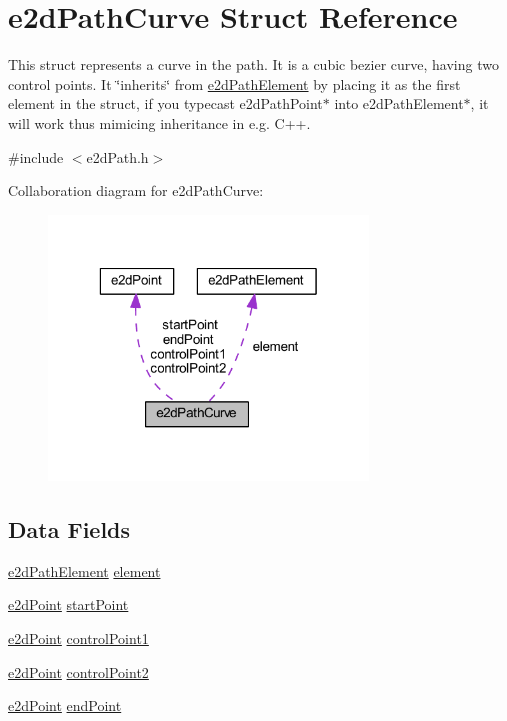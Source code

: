 \hypertarget{structe2dPathCurve}{\section{e2d\-Path\-Curve Struct Reference}
\label{structe2dPathCurve}
}


This struct represents a curve in the path. It is a cubic bezier curve, having two control points. It \char`\"{}inherits\char`\"{} from \hyperlink{structe2dPathElement}{e2d\-Path\-Element} by placing it as the first element in the struct, if you typecast e2d\-Path\-Point$\ast$ into e2d\-Path\-Element$\ast$, it will work thus mimicing inheritance in e.\-g. C++.  




{\ttfamily \#include $<$e2d\-Path.\-h$>$}



Collaboration diagram for e2d\-Path\-Curve\-:\nopagebreak
\begin{figure}[H]
\begin{center}
\leavevmode
\includegraphics[width=241pt]{structe2dPathCurve__coll__graph}
\end{center}
\end{figure}
\subsection*{Data Fields}
\begin{DoxyCompactItemize}
\item 
\hyperlink{structe2dPathElement}{e2d\-Path\-Element} \hyperlink{structe2dPathCurve_a88e514266530010a1a3b08198b3cc763}{element}
\item 
\hyperlink{structe2dPoint}{e2d\-Point} \hyperlink{structe2dPathCurve_a96868a222a14861eb6e64214328c6159}{start\-Point}
\item 
\hyperlink{structe2dPoint}{e2d\-Point} \hyperlink{structe2dPathCurve_a5fe58a06185a33704c2cc77c8a58fb0d}{control\-Point1}
\item 
\hyperlink{structe2dPoint}{e2d\-Point} \hyperlink{structe2dPathCurve_a929324aa1e3527d71e312e5f80cb24db}{control\-Point2}
\item 
\hyperlink{structe2dPoint}{e2d\-Point} \hyperlink{structe2dPathCurve_a0ae59a21d141722d36c0ebc740587f9d}{end\-Point}
\end{DoxyCompactItemize}


